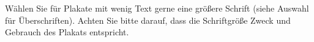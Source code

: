 
\clearpage



\PlakatKopfzeileMitDreizeiler
\PlakatFusszeileLeer

\PlakatTitelSchriftgroesse

Wählen Sie für Plakate mit wenig Text gerne eine größere Schrift (siehe Auswahl für Überschriften). Achten Sie bitte darauf, dass die Schriftgröße Zweck und Gebrauch des Plakats entspricht.


